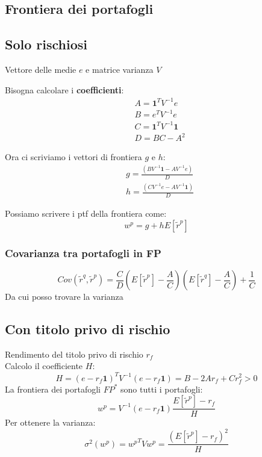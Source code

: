 \documentclass[a4paper,notitlepage]{report}%
\begin{document}
\begin{multicols*}{2}
\section*{Frontiera dei portafogli}

    \subsection*{Solo rischiosi}
        Vettore delle medie $e$ e matrice varianza $V$

        Bisogna calcolare i \textbf{coefficienti}:
        \begin{align*}
            & A = \mathbf{1}^T V^{-1} e \\
            & B = e^T V^{-1} e \\
            & C = \mathbf{1}^T V^{-1} \mathbf{1} \\
            & D = BC-A^2
        \end{align*}

        Ora ci scriviamo i vettori di frontiera $g$ e $h$:
        \begin{align*}
            & g = \frac{(BV^{-1}\mathbf{1} - AV^{-1}e)}{D} \\
            & h = \frac{(CV^{-1}e - AV^{-1}\mathbf{1})}{D}
        \end{align*}

        Possiamo scrivere i ptf della frontiera come:
        \[
            w^p = g+hE[\tilde{r}^p]   
        \]
    
    \subsubsection*{Covarianza tra portafogli in FP}
    \[
        Cov(\tilde{r}^q, \tilde{r}^p ) = \frac{C}{D} \left(E[\tilde{r}^p]-\frac{A}{C}\right) \left(E[\tilde{r}^q]-\frac{A}{C}\right) + \frac{1}{C}
    \]
    Da cui posso trovare la varianza

    \subsection*{Con titolo privo di rischio}
        Rendimento del titolo privo di rischio $r_f$\\
        Calcolo il coefficiente $H$:
        \[
            H = (e-r_f\mathbf{1})^T V^{-1} (e-r_f\mathbf{1}) = B-2Ar_f+Cr_f^2>0
        \]
        La frontiera dei portafogli $FP^*$ sono tutti i portafogli:
        \[
            w^p = V^{-1} (e-r_f\mathbf{1}) \frac{E[\tilde{r}^p]-r_f}{H}
        \]
        Per ottenere la varianza:
        \[
            \sigma^2(w^p) = { w^p}^T V w^p = \frac{(E[\tilde{r}^p]-r_f)^2}{H}
        \]


\end{multicols*}
\end{document}
